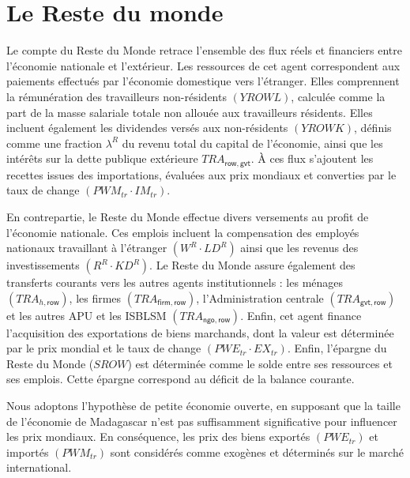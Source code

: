 \documentclass[11pt,a4paper]{article}
\newcommand{\gvt}{\mathsf{gvt}}
\newcommand{\firm}{\mathsf{firm}}
\newcommand{\ngo}{\mathsf{ngo}}
\newcommand{\row}{\mathsf{row}}
\newcommand{\EX}{\mathit{EX}}
\newcommand{\IM}{\mathit{IM}}
\newcommand{\KD}{\mathit{KD}}
\newcommand{\LD}{\mathit{LD}}
\newcommand{\TRA}{\mathit{TRA}}
\newcommand{\PWE}{\mathit{PWE}}
\newcommand{\PWM}{\mathit{PWM}}
\newcommand{\tr}{\mathit{tr}}
\newcommand{\YROWK}{\mathit{YROWK}}
\newcommand{\YROWL}{\mathit{YROWL}}
\newcommand{\SROW}{\mathit{SROW}}
\begin{document}
	
	
	\section{Le Reste du monde}
	Le compte du Reste du Monde retrace l'ensemble des flux réels et financiers entre l'économie nationale et l'extérieur. Les ressources de cet agent correspondent aux paiements effectués par l'économie domestique vers l'étranger. Elles comprennent la rémunération des travailleurs non-résidents $(\YROWL)$, calculée comme la part de la masse salariale totale non allouée aux travailleurs résidents. Elles incluent également les dividendes versés aux non-résidents $(\YROWK)$, définis comme une fraction $\lambda^R$ du revenu total du capital de l'économie, ainsi que les intérêts sur la dette publique extérieure $\TRA_{\row,\gvt}$. À ces flux s'ajoutent les recettes issues des importations, évaluées aux prix mondiaux et converties par le taux de change $\left(\PWM_{\tr} \cdot \IM_{\tr}\right)$.
	
	En contrepartie, le Reste du Monde effectue divers versements au profit de l'économie nationale. Ces emplois incluent la compensation des employés nationaux travaillant à l'étranger $\left(W^R \cdot \LD^R\right)$ ainsi que les revenus des investissements $\left(R^R \cdot \KD^R\right)$. Le Reste du Monde assure également des transferts courants vers les autres agents institutionnels : les ménages $\left(\TRA_{h,\row}\right)$, les firmes $\left(\TRA_{\firm,\row}\right)$, l'Administration centrale $\left(\TRA_{\gvt,\row}\right)$ et les autres APU et les ISBLSM $\left(\TRA_{\ngo,\row}\right)$. Enfin, cet agent finance l'acquisition des exportations de biens marchands, dont la valeur est déterminée par le prix mondial et le taux de change $\left(\PWE_{\tr} \cdot \EX_{\tr}\right)$. Enfin, l'épargne du Reste du Monde ($\SROW$) est déterminée comme le solde entre ses ressources et ses emplois. Cette épargne correspond au déficit de la balance courante.
	
	Nous adoptons l'hypothèse de petite économie ouverte, en supposant que la taille de l'économie de Madagascar n'est pas suffisamment significative pour influencer les prix mondiaux. En conséquence, les prix des biens exportés $\left(\PWE_{\tr}\right)$ et importés $\left(\PWM_{\tr}\right)$ sont considérés comme exogènes et déterminés sur le marché international.
	
\end{document}

